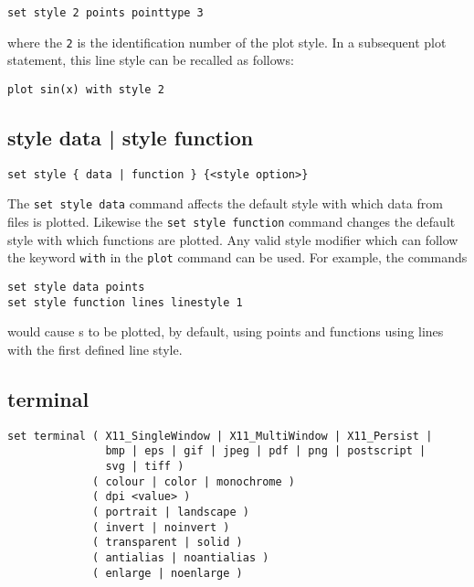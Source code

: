 \begin{verbatim}
set style 2 points pointtype 3
\end{verbatim}

\noindent where the {\tt 2} is the identification number of the plot style.
In a subsequent plot statement, this line style can be recalled as follows:

\begin{verbatim}
plot sin(x) with style 2
\end{verbatim}


\subsection{style data | style function}

\begin{verbatim}
set style { data | function } {<style option>}
\end{verbatim}

The {\tt set style data} command affects the default style with which data from
files is plotted.  Likewise the {\tt set style function} command changes the
default style with which functions are plotted.  Any valid style modifier which
can follow the keyword {\tt with} in the {\tt plot} command can be used.  For
example, the commands

\begin{verbatim}
set style data points
set style function lines linestyle 1
\end{verbatim}

\noindent would cause \datafile s to be plotted, by default, using points and
functions using lines with the first defined line style.


\subsection{terminal}

\begin{verbatim}
set terminal ( X11_SingleWindow | X11_MultiWindow | X11_Persist |
               bmp | eps | gif | jpeg | pdf | png | postscript |
               svg | tiff )
             ( colour | color | monochrome )
             ( dpi <value> )
             ( portrait | landscape )
             ( invert | noinvert )
             ( transparent | solid )
             ( antialias | noantialias )
             ( enlarge | noenlarge )
\end{verbatim}

